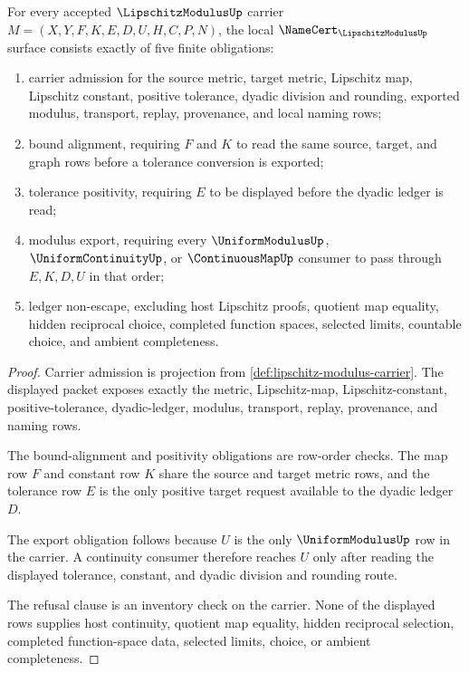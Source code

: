 \begin{theorem}\label{thm:lipschitz-modulus-namecert-obligations}
For every accepted $\LipschitzModulusUp$ carrier $M=(X,Y,F,K,E,D,U,H,C,P,N)$, the local $\NameCert_{\LipschitzModulusUp}$ surface consists exactly of five finite obligations:
\begin{enumerate}
\item carrier admission for the source metric, target metric, Lipschitz map, Lipschitz constant, positive tolerance, dyadic division and rounding, exported modulus, transport, replay, provenance, and local naming rows;
\item bound alignment, requiring $F$ and $K$ to read the same source, target, and graph rows before a tolerance conversion is exported;
\item tolerance positivity, requiring $E$ to be displayed before the dyadic ledger is read;
\item modulus export, requiring every $\UniformModulusUp$, $\UniformContinuityUp$, or $\ContinuousMapUp$ consumer to pass through $E,K,D,U$ in that order;
\item ledger non-escape, excluding host Lipschitz proofs, quotient map equality, hidden reciprocal choice, completed function spaces, selected limits, countable choice, and ambient completeness.
\end{enumerate}
\end{theorem}
\begin{proof}
Carrier admission is projection from \autoref{def:lipschitz-modulus-carrier}. The displayed packet exposes exactly the metric, Lipschitz-map, Lipschitz-constant, positive-tolerance, dyadic-ledger, modulus, transport, replay, provenance, and naming rows.

The bound-alignment and positivity obligations are row-order checks. The map row $F$ and constant row $K$ share the source and target metric rows, and the tolerance row $E$ is the only positive target request available to the dyadic ledger $D$.

The export obligation follows because $U$ is the only $\UniformModulusUp$ row in the carrier. A continuity consumer therefore reaches $U$ only after reading the displayed tolerance, constant, and dyadic division and rounding route.

The refusal clause is an inventory check on the carrier. None of the displayed rows supplies host continuity, quotient map equality, hidden reciprocal selection, completed function-space data, selected limits, choice, or ambient completeness.
\end{proof}


